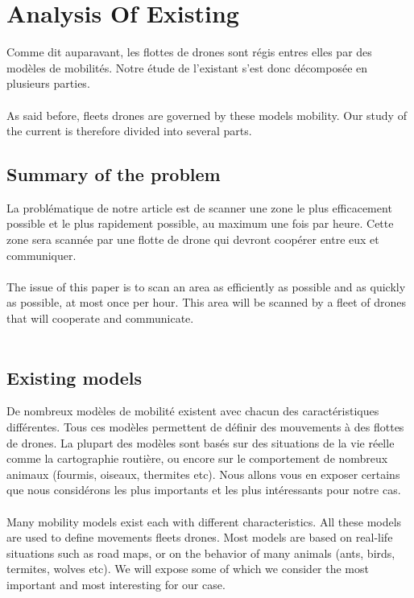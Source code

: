 \chapter{Analysis Of Existing}

Comme dit auparavant, les flottes de drones sont régis entres elles par des modèles de mobilités. Notre étude de l'existant s'est donc décomposée en plusieurs parties.\\\\

As said before, fleets drones are governed by these models mobility. Our study of the current is therefore divided into several parts. \ \ \ \

\section{Summary of the problem}

La problématique de notre article est de scanner une zone le plus efficacement possible et le plus rapidement possible, au maximum une fois par heure. Cette zone sera scannée par une flotte de drone qui devront coopérer entre eux et communiquer.\\\\

The issue of this paper is to scan an area as efficiently as possible and as quickly as possible, at most once per hour. This area will be scanned by a fleet of drones that will cooperate and communicate.\\\\


\section{Existing models}

De nombreux modèles de mobilité existent avec chacun des caractéristiques différentes. Tous ces modèles permettent de définir des mouvements à des flottes de drones. La plupart des modèles sont basés sur des situations de la vie réelle comme la cartographie routière, ou encore sur le comportement de nombreux animaux (fourmis, oiseaux, thermites etc). Nous allons vous en exposer certains que nous considérons les plus importants et les plus intéressants pour notre cas.\\\\

Many mobility models exist each with different characteristics. All these models are used to define movements fleets drones. Most models are based on real-life situations such as road maps, or on the behavior of many animals (ants, birds, termites, wolves etc). We will expose some of which we consider the most important and most interesting for our case.\\\\ 

